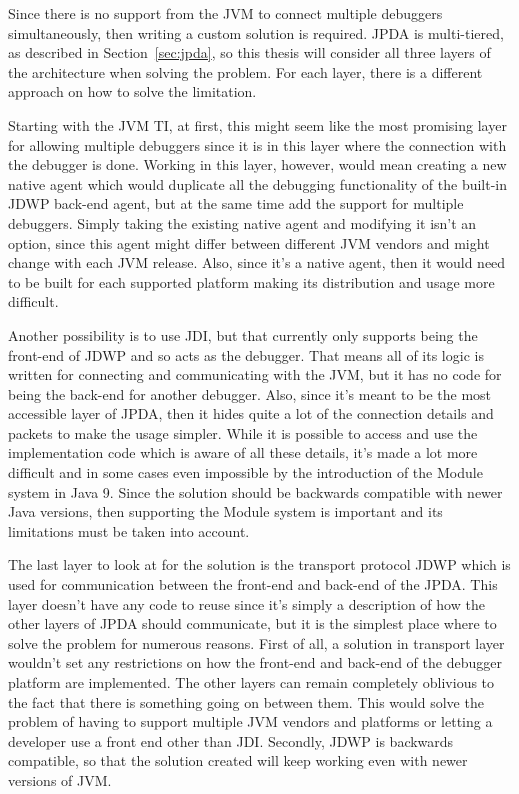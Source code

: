 \documentclass[..thesis.tex]{subfiles}
\begin{document}
Since there is no support from the JVM to connect multiple debuggers simultaneously, then writing a custom solution is required. 
JPDA is multi-tiered, as described in Section~\ref{sec:jpda}, so this thesis will consider all three layers of the architecture when solving the problem.
For each layer, there is a different approach on how to solve the limitation.

Starting with the JVM TI, at first, this might seem like the most promising layer for allowing multiple debuggers since it is in this layer where the connection with the debugger is done.
Working in this layer, however, would mean creating a new native agent which would duplicate all the debugging functionality of the built-in JDWP back-end agent, but at the same time add the support for multiple debuggers.
Simply taking the existing native agent and modifying it isn't an option, since this agent might differ between different JVM vendors and might change with each JVM release.
Also, since it's a native agent, then it would need to be built for each supported platform making its distribution and usage more difficult.

Another possibility is to use JDI, but that currently only supports being the front-end of JDWP and so acts as the debugger.
That means all of its logic is written for connecting and communicating with the JVM, but it has no code for being the back-end for another debugger.
Also, since it's meant to be the most accessible layer of JPDA, then it hides quite a lot of the connection details and packets to make the usage simpler.
While it is possible to access and use the implementation code which is aware of all these details, it's made a lot more difficult and in some cases even impossible by the introduction of the Module system in Java 9.
Since the solution should be backwards compatible with newer Java versions, then supporting the Module system is important and its limitations must be taken into account. 

The last layer to look at for the solution is the transport protocol JDWP which is used for communication between the front-end and back-end of the JPDA.
This layer doesn't have any code to reuse since it's simply a description of how the other layers of JPDA should communicate, but it is the simplest place where to solve the problem for numerous reasons.
First of all, a solution in transport layer wouldn't set any restrictions on how the front-end and back-end of the debugger platform are implemented.
The other layers can remain completely oblivious to the fact that there is something going on between them.
This would solve the problem of having to support multiple JVM vendors and platforms or letting a developer use a front end other than JDI.
Secondly, JDWP is backwards compatible, so that the solution created will keep working even with newer versions of JVM.
\end{document}
